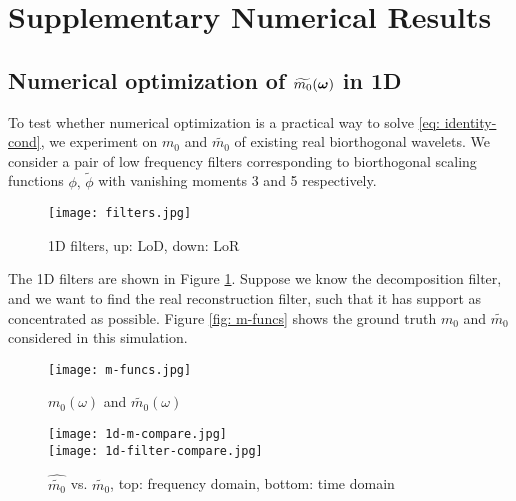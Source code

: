 \section{Supplementary Numerical Results}\label{app: supp-numerical}
\subsection{Numerical optimization of $\widetilde{m_{0}}(\boldsymbol{\omega})$ in 1D}\label{subsec: 1D-opt}
To test whether numerical optimization is a practical way to solve \eqref{eq: identity-cond}, we experiment on $m_0$ and $\widetilde{m_0}$ of existing real biorthogonal wavelets. We consider a pair of low frequency filters corresponding to biorthogonal scaling functions $\phi,\, \tilde{\phi}$ with vanishing moments 3 and 5 respectively. 

\begin{figure}
\centering
\texttt{[image: filters.jpg]}
\caption{1D filters, up: LoD, down: LoR}
\label{fig: filters}
\end{figure}
The 1D filters are shown in Figure \ref{fig: filters}. Suppose we know the decomposition filter, and we want to find the real reconstruction filter, such that it has support as concentrated as possible. 
Figure \ref{fig: m-funcs} shows the ground truth $m_0$ and $\widetilde{m_0}$ considered in this simulation. %
\begin{figure}%
\begin{minipage}[t]{.45\textwidth}
\texttt{[image: m-funcs.jpg]}
\caption{$m_0(\omega)$ and $\widetilde{m_0}(\omega)$}
\label{fig: m-funcs}
\end{minipage}
\hfill
\begin{minipage}[t]{.45\textwidth}
\vbox{
\texttt{[image: 1d-m-compare.jpg]}\\
\texttt{[image: 1d-filter-compare.jpg]}
}
\caption{$\widehat{\widetilde{m_0}}$ vs. $\widetilde{m_0}$, top: frequency domain, bottom: time domain}
\label{fig: 1d-compare}
\end{minipage}
\end{figure}

